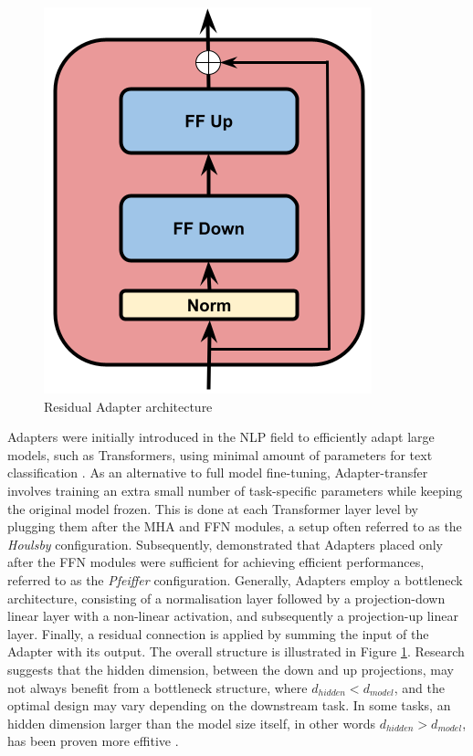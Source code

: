 \begin{figure}[t]
    \begin{center}
    \includegraphics[scale=0.3]{imgs/Adapter_alone.png}
    \caption{Residual Adapter architecture}
    \label{fig:Adapter_architecture}
    \end{center}
    \end{figure}


Adapters were initially introduced in the \ac{NLP} field to efficiently adapt large models, such as Transformers, using minimal amount of parameters for text classification \cite{houlsby}. As an alternative to full model fine-tuning, Adapter-transfer involves training an extra small number of task-specific parameters while keeping the original model frozen. This is done at each Transformer layer level by plugging them after the \ac{MHA} and \ac{FFN} modules, a setup often referred to as the \textit{Houlsby} configuration. Subsequently, \cite{pfeiffer} demonstrated that Adapters placed only after the \ac{FFN} modules were sufficient for achieving efficient performances, referred to as the \textit{Pfeiffer} configuration. Generally, Adapters employ a bottleneck architecture, consisting of a normalisation layer followed by a projection-down linear layer with a non-linear activation, and subsequently a projection-up linear layer. Finally, a residual connection is applied by summing the input of the Adapter with its output. The overall structure is illustrated in Figure \ref{fig:Adapter_architecture}. Research suggests that the hidden dimension, between the down and up projections, may not always benefit from a bottleneck structure, where $d_{hidden} < d_{model}$, and the optimal design may vary depending on the downstream task. In some tasks, an hidden dimension larger than the model size itself, in other words $d_{hidden} > d_{model}$, has been proven more effitive \cite{fan2022draft}.

